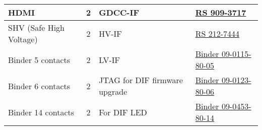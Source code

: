 {
\setlength{\extrarowheight}{1pt}
\setlength\arrayrulewidth{1pt}\setlength\doublerulesep{0pt}
\label{table:housing}

\tablelasttail{}
\begin{center}
\begin{xtabular}{|l|c|l|l|}
HDMI                    & 2 & GDCC-IF                       & \href{https://jp.rs-online.com/web/p/hdmi-connectors/9093717/}{RS 909-3717}                      \\
\hline
{}SHV (Safe High Voltage) & 2 & HV-IF                         & \href{https://jp.rs-online.com/web/p/shv-connectors/2127444/}{RS 212-7444}                       \\
\hline
{}Binder 5 contacts       & 2 & LV-IF                         & \href{https://www.binder-connector.de/pdfsheets/download/en/09+0115+80+05}{Binder 09-0115-80-05} \\
\hline
{}Binder 6 contacts       & 2 & JTAG for DIF firmware upgrade & \href{http://www.binder-connector.com/pdfsheets/download/en/09+0123+80+06}{Binder 09-0123-80-06} \\
\hline
{}Binder 14 contacts      & 2 & For DIF LED                   & \href{https://www.binder-connector.de/pdfsheets/download/en/09+0453+80+14}{Binder 09-0453-80-14} \\
\hline
\end{xtabular}
\end{center}
} 
